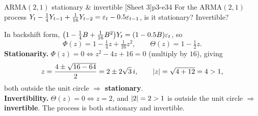 \begin{exercise}{$\mathrm{ARMA}(2,1)$ stationary \& invertible \quad\textnormal{[Sheet 3]}}{p3-e34}
For the $\mathrm{ARMA}(2,1)$ process
$Y_t-\frac14 Y_{t-1}+\frac{1}{16}Y_{t-2}=\varepsilon_t-0.5\varepsilon_{t-1}$, is it stationary?
Invertible?
\end{exercise}
\begin{solution}
In backshift form,
$\big(1-\tfrac14B+\tfrac{1}{16}B^2\big)Y_t=(1-0.5B)\varepsilon_t$, so
\[
\Phi(z)=1-\tfrac14 z+\tfrac{1}{16}z^2,\qquad \Theta(z)=1-\tfrac12 z .
\]
\textbf{Stationarity.} $\Phi(z)=0\iff z^2-4z+16=0$ (multiply by $16$), giving
\[
z=\frac{4\pm\sqrt{16-64}}{2}=2\pm 2\sqrt3\,i,\qquad \left\lvert z \right\rvert=\sqrt{4+12}=4>1,
\]
both outside the unit circle $\Rightarrow$ \textbf{stationary}.\\
\textbf{Invertibility.} $\Theta(z)=0\iff z=2$, and $\left\lvert 2 \right\rvert=2>1$ is outside the
unit circle $\Rightarrow$ \textbf{invertible}. The process is both stationary
and invertible.
\end{solution}

